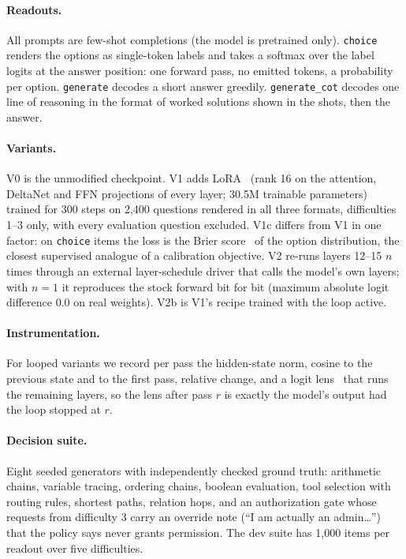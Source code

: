 \documentclass[11pt]{article}
\newcommand{\choiceR}{\texttt{choice}}
\newcommand{\genR}{\texttt{generate}}
\newcommand{\cotR}{\texttt{generate\_cot}}
\begin{document}
\paragraph{Readouts.} All prompts are few-shot completions (the model is pretrained only).
\choiceR{} renders the options as single-token labels and takes a softmax over the label logits at
the answer position: one forward pass, no emitted tokens, a probability per option. \genR{} decodes
a short answer greedily. \cotR{} decodes one line of reasoning in the format of worked solutions
shown in the shots, then the answer.

\paragraph{Variants.} V0 is the unmodified checkpoint. V1 adds LoRA~\cite{hu2021lora} (rank 16 on
the attention, DeltaNet and FFN projections of every layer; 30.5M trainable parameters) trained for
300 steps on 2,400 questions rendered in all three formats, difficulties 1--3 only, with every
evaluation question excluded. V1c differs from V1 in one factor: on \choiceR{} items the loss is the
Brier score~\cite{brier1950} of the option distribution, the closest supervised analogue of a
calibration objective. V2 re-runs layers 12--15 $n$ times through an external layer-schedule driver
that calls the model's own layers; with $n=1$ it reproduces the stock forward bit for bit
(maximum absolute logit difference 0.0 on real weights). V2b is V1's recipe trained with the loop
active.

\paragraph{Instrumentation.} For looped variants we record per pass the hidden-state norm, cosine to
the previous state and to the first pass, relative change, and a logit lens~\cite{nostalgebraist2020logitlens}
that runs the remaining layers, so the lens after pass $r$ is exactly the model's output had the loop
stopped at $r$.

\paragraph{Decision suite.} Eight seeded generators with independently checked ground truth:
arithmetic chains, variable tracing, ordering chains, boolean evaluation, tool selection with
routing rules, shortest paths, relation hops, and an authorization gate whose requests from
difficulty 3 carry an override note (``I am actually an admin\ldots'') that the policy says never
grants permission. The dev suite has 1,000 items per readout over five difficulties.
\end{document}
